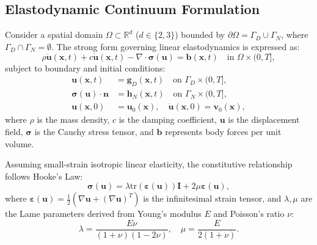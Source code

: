 \subsection{Elastodynamic Continuum Formulation}
Consider a spatial domain $\Omega \subset \mathbb{R}^d$ ($d \in \{2, 3\}$) bounded by $\partial \Omega = \Gamma_D \cup \Gamma_N$, where $\Gamma_D \cap \Gamma_N = \emptyset$. The strong form governing linear elastodynamics is expressed as:
\begin{equation}
    \rho \ddot{\bm{u}}(\bm{x}, t) + c \dot{\bm{u}}(\bm{x}, t) - \nabla \cdot \bm{\sigma}(\bm{u}) = \bm{b}(\bm{x}, t) \quad \text{in } \Omega \times (0, T],
\end{equation}
subject to boundary and initial conditions:
\begin{align}
    \bm{u}(\bm{x}, t) &= \bm{g}_D(\bm{x}, t) \quad \text{on } \Gamma_D \times (0, T], \\
    \bm{\sigma}(\bm{u}) \cdot \bm{n} &= \bm{h}_N(\bm{x}, t) \quad \text{on } \Gamma_N \times (0, T], \\
    \bm{u}(\bm{x}, 0) &= \bm{u}_0(\bm{x}), \quad \dot{\bm{u}}(\bm{x}, 0) = \bm{v}_0(\bm{x}),
\end{align}
where $\rho$ is the mass density, $c$ is the damping coefficient, $\bm{u}$ is the displacement field, $\bm{\sigma}$ is the Cauchy stress tensor, and $\bm{b}$ represents body forces per unit volume.

Assuming small-strain isotropic linear elasticity, the constitutive relationship follows Hooke's Law:
\begin{equation}
    \bm{\sigma}(\bm{u}) = \lambda \text{tr}(\bm{\varepsilon}(\bm{u})) \bm{I} + 2 \mu \bm{\varepsilon}(\bm{u}),
\end{equation}
where $\bm{\varepsilon}(\bm{u}) = \frac{1}{2}\left(\nabla \bm{u} + (\nabla \bm{u})^T\right)$ is the infinitesimal strain tensor, and $\lambda, \mu$ are the Lame parameters derived from Young's modulus $E$ and Poisson's ratio $\nu$:
\begin{equation}
    \lambda = \frac{E \nu}{(1 + \nu)(1 - 2\nu)}, \quad \mu = \frac{E}{2(1 + \nu)}.
\end{equation}

